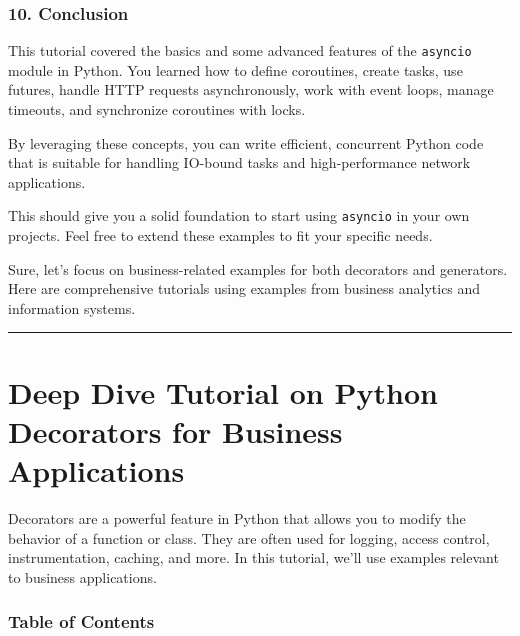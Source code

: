 \documentclass[
  letterpaper,
  DIV=11,
  numbers=noendperiod]{scrreprt}
\begin{document}
\subsection{10. Conclusion}\label{conclusion-25}

This tutorial covered the basics and some advanced features of the
\texttt{asyncio} module in Python. You learned how to define coroutines,
create tasks, use futures, handle HTTP requests asynchronously, work
with event loops, manage timeouts, and synchronize coroutines with
locks.

By leveraging these concepts, you can write efficient, concurrent Python
code that is suitable for handling IO-bound tasks and high-performance
network applications.

This should give you a solid foundation to start using \texttt{asyncio}
in your own projects. Feel free to extend these examples to fit your
specific needs.

Sure, let's focus on business-related examples for both decorators and
generators. Here are comprehensive tutorials using examples from
business analytics and information systems.

\begin{center}\rule{0.5\linewidth}{0.5pt}\end{center}


\chapter{Deep Dive Tutorial on Python Decorators for Business
Applications}\label{deep-dive-tutorial-on-python-decorators-for-business-applications}

Decorators are a powerful feature in Python that allows you to modify
the behavior of a function or class. They are often used for logging,
access control, instrumentation, caching, and more. In this tutorial,
we'll use examples relevant to business applications.

\subsection{Table of Contents}\label{table-of-contents-13}
\end{document}
